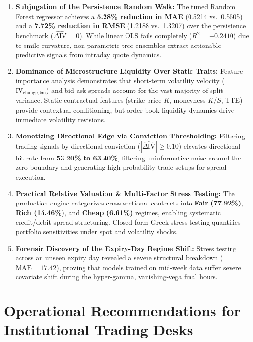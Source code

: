 \begin{enumerate}\setlength{\itemsep}{2pt}\setlength{\parskip}{0pt}
    \item \textbf{Subjugation of the Persistence Random Walk:} The tuned Random Forest regressor achieves a \textbf{5.28\% reduction in MAE} (0.5214 vs.\ 0.5505) and a \textbf{7.72\% reduction in RMSE} (1.2188 vs.\ 1.3207) over the persistence benchmark ($\widehat{\Delta \text{IV}} = 0$). While linear OLS fails completely ($R^2 = -0.2410$) due to smile curvature, non-parametric tree ensembles extract actionable predictive signals from intraday quote dynamics.
    \item \textbf{Dominance of Microstructure Liquidity Over Static Traits:} Feature importance analysis demonstrates that short-term volatility velocity ($\text{IV}_{\text{change}, 5\text{m}}$) and bid-ask spreads account for the vast majority of split variance. Static contractual features (strike price $K$, moneyness $K/S$, TTE) provide contextual conditioning, but order-book liquidity dynamics drive immediate volatility revisions.
    \item \textbf{Monetizing Directional Edge via Conviction Thresholding:} Filtering trading signals by directional conviction ($|\widehat{\Delta\text{IV}}| \ge 0.10$) elevates directional hit-rate from \textbf{53.20\% to 63.40\%}, filtering uninformative noise around the zero boundary and generating high-probability trade setups for spread execution.
    \item \textbf{Practical Relative Valuation \& Multi-Factor Stress Testing:} The production engine categorizes cross-sectional contracts into \textbf{Fair (77.92\%)}, \textbf{Rich (15.46\%)}, and \textbf{Cheap (6.61\%)} regimes, enabling systematic credit/debit spread structuring. Closed-form Greek stress testing quantifies portfolio sensitivities under spot and volatility shocks.
    \item \textbf{Forensic Discovery of the Expiry-Day Regime Shift:} Stress testing across an unseen expiry day revealed a severe structural breakdown ($\text{MAE} = 17.42$), proving that models trained on mid-week data suffer severe covariate shift during the hyper-gamma, vanishing-vega final hours.
\end{enumerate}

\section{Operational Recommendations for Institutional Trading Desks}
\label{sec:operational_recommendations}

